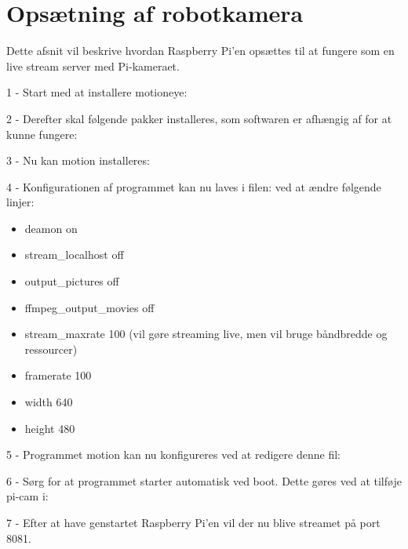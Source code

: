 \chapter{Opsætning af robotkamera}
\label{appendix:Opsaetning_af_robotkamera}

Dette afsnit vil beskrive hvordan Raspberry Pi'en opsættes til at fungere som en live stream server med Pi-kameraet.

1 - Start med at installere motioneye:

2 - Derefter skal følgende pakker installeres, som softwaren er afhængig af for at kunne fungere:

3 - Nu kan motion installeres:

4 - Konfigurationen af programmet kan nu laves i filen:
ved at ændre følgende linjer:
\begin{itemize}
	\item deamon on
	\item stream\_localhost off
	\item output\_pictures off
	\item ffmpeg\_output\_movies off
	\item stream\_maxrate 100 (vil gøre streaming live, men vil bruge båndbredde og ressourcer)
	\item framerate 100
	\item width 640
	\item height 480
\end{itemize}


5 - Programmet motion kan nu konfigureres ved at redigere denne fil:

6 - Sørg for at programmet starter automatisk ved boot. Dette gøres ved at tilføje pi-cam i:

7 - Efter at have genstartet Raspberry Pi’en vil der nu blive streamet på port 8081.

